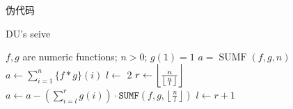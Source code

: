 \begin{frame}[fragile]{伪代码}
	\label{mulf:ssec:duseive-psdcode}

	\begin{algorithm}[H]
		\caption{DU's seive}\label{mulf:algo:duseive}
		\begin{algorithmic}
			\Require \(f, g\) are numeric functions; \(n>0\); \(g(1)=1\)
			\Ensure \(a=\operatorname{SUMF}(f,g,n)\)
			\State \(a \gets \sum_{i=1}^n \{f*g\}(i)\)
			\State \(l \gets\) 2
			\State \(r \gets \left\lfloor {n \over \left\lfloor \frac{n}{l} \right\rfloor} \right\rfloor\)
			\State \(a \gets a-\left(\sum_{i=l}^r g(i)\right)\cdot\texttt{SUMF}\left(f,g,\left\lfloor \frac{n}{l} \right\rfloor\right)\)
			\State \(l \gets r+1\)
			\EndWhile
		\end{algorithmic}
	\end{algorithm}
\end{frame}
